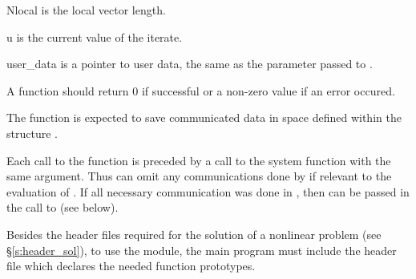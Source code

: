 {
  \begin{args}
  \item[Nlocal]
    is the local vector length.
  \item[u]
    is the current value of the iterate.
  \item[user\_data]
    is a pointer to user data, the same as the 
    parameter passed to .
  \end{args}
}
{
  A  function should return 0 if successful or a non-zero
  value if an error occured.
}
{
  The  function is expected to save communicated data in space defined
  within the structure .

  Each call to the  function is preceded by a call to the system function
   with the same  argument.  Thus  can omit
  any communications done by  if relevant to the evaluation of .
  If all necessary communication was done in , then 
  can be passed in the call to  (see below).
}

Besides the header files required for the solution of a nonlinear problem
(see \S\ref{s:header_sol}),  to use the {\kinbbdpre} module, the main program
must include the header file  which declares the needed
function prototypes.


